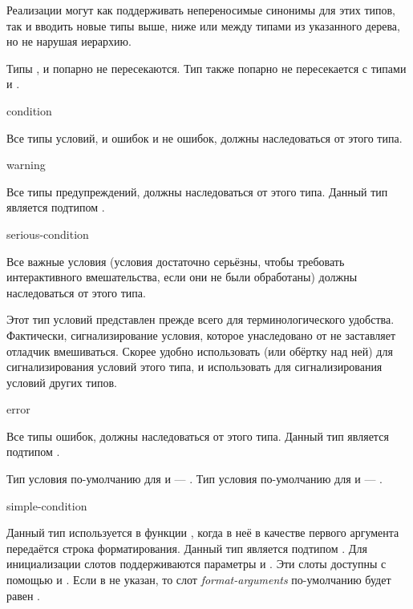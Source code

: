 Реализации могут как поддерживать непереносимые синонимы для этих типов, так и
вводить новые типы выше, ниже или между типами из указанного дерева, но не
нарушая иерархию.

Типы ,  и  попарно не
пересекаются. Тип  также попарно не пересекается с типами
 и .

\begin{defun}[Тип]
condition

Все типы условий, и ошибок и не ошибок, должны наследоваться от этого типа.
\end{defun}

\begin{defun}[Тип]
warning

Все типы предупреждений, должны наследоваться от этого типа. Данный тип является
подтипом .
\end{defun}

\begin{defun}[Тип]
serious-condition

Все важные условия (условия достаточно серьёзны, чтобы требовать интерактивного
вмешательства, если они не были обработаны) должны наследоваться от этого типа. 

Этот тип условий представлен прежде всего для терминологического
удобства. Фактически, сигнализирование условия, которое унаследовано от
 не заставляет отладчик вмешиваться. Скорее удобно
использовать  (или обёртку над ней) для сигнализирования условий
этого типа, и использовать  для сигнализирования условий других типов.
\end{defun}

\begin{defun}[Тип]
error

Все типы ошибок, должны наследоваться от этого типа. Данный тип является
подтипом .
\end{defun}

Тип условия по-умолчанию для  и  ---
.
Тип условия по-умолчанию для  и  --- .

\begin{defun}[Тип]
simple-condition

Данный тип используется в функции , когда в неё в качестве первого
аргумента передаётся строка форматирования. Данный тип является подтипом
. Для инициализации слотов поддерживаются 
параметры  и . Эти слоты доступны с
помощью  и
. Если в 
 не указан, то слот \emph{format-arguments} по-умолчанию
будет равен .
\end{defun}

